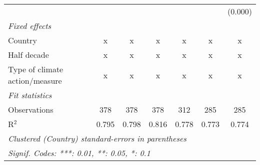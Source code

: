 \begin{tabular}{lcccccc}
                                                   &         &         &                &                &                & (0.000)\\   
   \emph{Fixed effects}\\
   Country                                         & x       & x       & x              & x              & x              & x\\  
   Half decade                                     & x       & x       & x              & x              & x              & x\\  
   Type of climate action/measure                  & x       & x       & x              & x              & x              & x\\  
   \midrule \emph{Fit statistics}\\
   Observations                                    & 378     & 378     & 378            & 312            & 285            & 285\\  
   R$^2$                                           & 0.795   & 0.798   & 0.816          & 0.778          & 0.773          & 0.774\\  
   \midrule
   \multicolumn{7}{l}{\emph{Clustered (Country) standard-errors in parentheses}}\\
   \multicolumn{7}{l}{\emph{Signif. Codes: ***: 0.01, **: 0.05, *: 0.1}}\\
\end{tabular}
\par\endgroup


